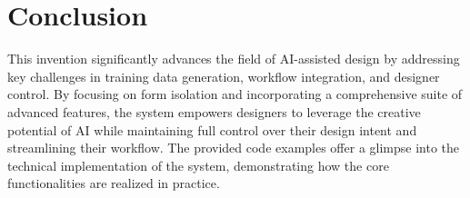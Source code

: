 \section{Conclusion}

This invention significantly advances the field of AI-assisted design by addressing key challenges in training data generation, workflow integration, and designer control. By focusing on form isolation and incorporating a comprehensive suite of advanced features, the system empowers designers to leverage the creative potential of AI while maintaining full control over their design intent and streamlining their workflow. The provided code examples offer a glimpse into the technical implementation of the system, demonstrating how the core functionalities are realized in practice.

